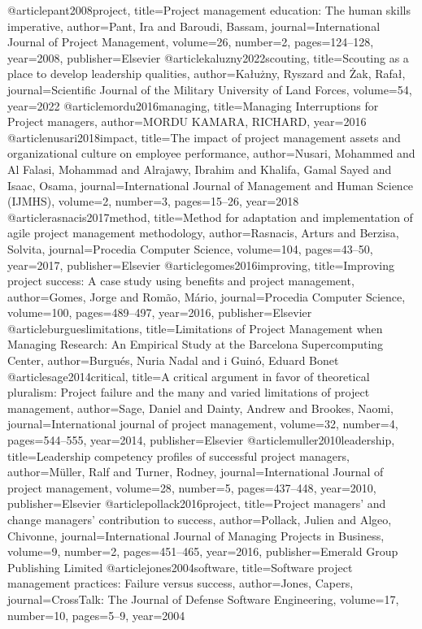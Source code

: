 
@article{pant2008project,
  title={Project management education: The human skills imperative},
  author={Pant, Ira and Baroudi, Bassam},
  journal={International Journal of Project Management},
  volume={26},
  number={2},
  pages={124--128},
  year={2008},
  publisher={Elsevier}
}
@article{kaluzny2022scouting,
  title={Scouting as a place to develop leadership qualities},
  author={Ka{\l}u{\.z}ny, Ryszard and {\.Z}ak, Rafa{\l}},
  journal={Scientific Journal of the Military University of Land Forces},
  volume={54},
  year={2022}
}
@article{mordu2016managing,
  title={Managing Interruptions for Project managers},
  author={MORDU KAMARA, RICHARD},
  year={2016}
}
@article{nusari2018impact,
  title={The impact of project management assets and organizational culture on employee performance},
  author={Nusari, Mohammed and Al Falasi, Mohammad and Alrajawy, Ibrahim and Khalifa, Gamal Sayed and Isaac, Osama},
  journal={International Journal of Management and Human Science (IJMHS)},
  volume={2},
  number={3},
  pages={15--26},
  year={2018}
}
@article{rasnacis2017method,
  title={Method for adaptation and implementation of agile project management methodology},
  author={Rasnacis, Arturs and Berzisa, Solvita},
  journal={Procedia Computer Science},
  volume={104},
  pages={43--50},
  year={2017},
  publisher={Elsevier}
}
@article{gomes2016improving,
  title={Improving project success: A case study using benefits and project management},
  author={Gomes, Jorge and Rom{\~a}o, M{\'a}rio},
  journal={Procedia Computer Science},
  volume={100},
  pages={489--497},
  year={2016},
  publisher={Elsevier}
}
@article{burgueslimitations,
  title={Limitations of Project Management when Managing Research: An Empirical Study at the Barcelona Supercomputing Center},
  author={Burgu{\'e}s, Nuria Nadal and i Guin{\'o}, Eduard Bonet}
}
@article{sage2014critical,
  title={A critical argument in favor of theoretical pluralism: Project failure and the many and varied limitations of project management},
  author={Sage, Daniel and Dainty, Andrew and Brookes, Naomi},
  journal={International journal of project management},
  volume={32},
  number={4},
  pages={544--555},
  year={2014},
  publisher={Elsevier}
}
@article{muller2010leadership,
  title={Leadership competency profiles of successful project managers},
  author={M{\"u}ller, Ralf and Turner, Rodney},
  journal={International Journal of project management},
  volume={28},
  number={5},
  pages={437--448},
  year={2010},
  publisher={Elsevier}
}
@article{pollack2016project,
  title={Project managers’ and change managers’ contribution to success},
  author={Pollack, Julien and Algeo, Chivonne},
  journal={International Journal of Managing Projects in Business},
  volume={9},
  number={2},
  pages={451--465},
  year={2016},
  publisher={Emerald Group Publishing Limited}
}
@article{jones2004software,
  title={Software project management practices: Failure versus success},
  author={Jones, Capers},
  journal={CrossTalk: The Journal of Defense Software Engineering},
  volume={17},
  number={10},
  pages={5--9},
  year={2004}
}

